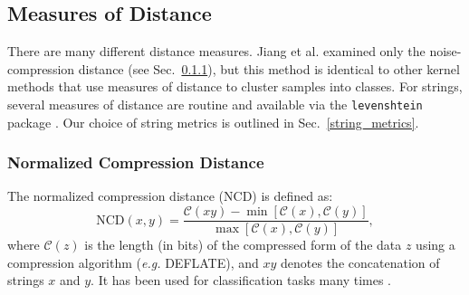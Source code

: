 \documentclass[conference]{IEEEtran}
\begin{document}
\subsection{Measures of Distance}
There are many different distance measures. Jiang et al. examined only the noise-compression distance (see Sec.~\ref{ncd}), but this method is identical to other kernel methods \cite{} that use measures of distance to cluster samples into classes. For strings, several measures of distance are routine and available via the \texttt{levenshtein} package \cite{levenshtein}. Our choice of string metrics is outlined in Sec.~\ref{string_metrics}.






\subsubsection{Normalized Compression Distance}
\label{ncd}
The normalized compression distance (NCD) is defined as:
\begin{equation}
    \text{NCD}(x, y) = \frac{\mathcal{C}(xy) - \min[\mathcal{C}(x), \mathcal{C}(y)]}{\max[\mathcal{C}(x), \mathcal{C}(y)]},
\end{equation}
where $\mathcal{C}(z)$ is the length (in bits) of the compressed form of the data $z$ using a compression algorithm (\textit{e.g.} DEFLATE), and $xy$ denotes the concatenation of strings $x$ and $y$. It has been used for classification tasks many times \cite{opitz2023gzip,weinreich2023parameter,nishida2011tweet,jiang2022less}.
\end{document}
